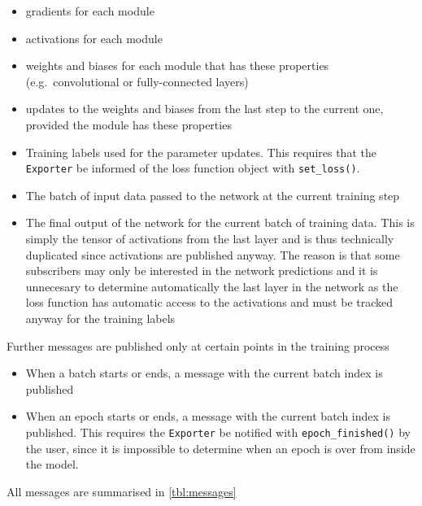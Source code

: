 \begin{itemize}
    \item
        gradients for each module
    \item
        activations for each module
    \item
        weights and biases for each module that has these properties
        (e.g.~convolutional or fully-connected layers)
    \item
        updates to the weights and biases from the last step to the current
        one, provided the module has these properties
    \item
        Training labels used for the parameter updates. This requires that the
        \texttt{Exporter} be informed of the loss function object with
        \lstinline{set_loss()}.
    \item
        The batch of input data passed to the network at the current training step
    \item
        The final output of the network for the current batch of training data.
        This is simply the tensor of activations from the last layer and is thus
        technically duplicated since activations are published anyway. The
        reason is that some subscribers may only be interested in the network
        predictions and it is unnecesary to determine automatically the last
        layer in the network as the loss function has automatic access to
        the activations and must be tracked anyway for the training labels
\end{itemize}

Further messages are published only at certain points in the training process

\begin{itemize}
    \item
        When a batch starts or ends, a message with the current batch index is published
    \item
        When an epoch starts or ends, a message with the current batch index is
        published. This requires the \texttt{Exporter} be notified with
        \lstinline{epoch_finished()} by the user, since it is impossible to
        determine when an epoch is over from inside the model.
\end{itemize}

All messages are summarised in \cref{tbl:messages}

